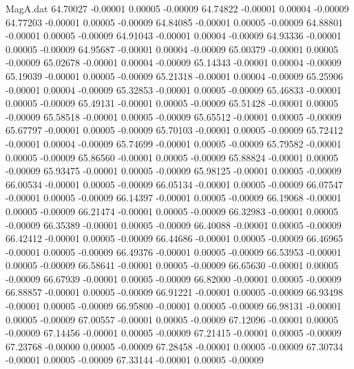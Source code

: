 \begin{filecontents}{MagA.dat}
  64.70027   -0.00001    0.00005   -0.00009
  64.74822   -0.00001    0.00004   -0.00009
  64.77203   -0.00001    0.00005   -0.00009
  64.84085   -0.00001    0.00005   -0.00009
  64.88801   -0.00001    0.00005   -0.00009
  64.91043   -0.00001    0.00004   -0.00009
  64.93336   -0.00001    0.00005   -0.00009
  64.95687   -0.00001    0.00004   -0.00009
  65.00379   -0.00001    0.00005   -0.00009
  65.02678   -0.00001    0.00004   -0.00009
  65.14343   -0.00001    0.00004   -0.00009
  65.19039   -0.00001    0.00005   -0.00009
  65.21318   -0.00001    0.00004   -0.00009
  65.25906   -0.00001    0.00004   -0.00009
  65.32853   -0.00001    0.00005   -0.00009
  65.46833   -0.00001    0.00005   -0.00009
  65.49131   -0.00001    0.00005   -0.00009
  65.51428   -0.00001    0.00005   -0.00009
  65.58518   -0.00001    0.00005   -0.00009
  65.65512   -0.00001    0.00005   -0.00009
  65.67797   -0.00001    0.00005   -0.00009
  65.70103   -0.00001    0.00005   -0.00009
  65.72412   -0.00001    0.00004   -0.00009
  65.74699   -0.00001    0.00005   -0.00009
  65.79582   -0.00001    0.00005   -0.00009
  65.86560   -0.00001    0.00005   -0.00009
  65.88824   -0.00001    0.00005   -0.00009
  65.93475   -0.00001    0.00005   -0.00009
  65.98125   -0.00001    0.00005   -0.00009
  66.00534   -0.00001    0.00005   -0.00009
  66.05134   -0.00001    0.00005   -0.00009
  66.07547   -0.00001    0.00005   -0.00009
  66.14397   -0.00001    0.00005   -0.00009
  66.19068   -0.00001    0.00005   -0.00009
  66.21474   -0.00001    0.00005   -0.00009
  66.32983   -0.00001    0.00005   -0.00009
  66.35389   -0.00001    0.00005   -0.00009
  66.40088   -0.00001    0.00005   -0.00009
  66.42412   -0.00001    0.00005   -0.00009
  66.44686   -0.00001    0.00005   -0.00009
  66.46965   -0.00001    0.00005   -0.00009
  66.49376   -0.00001    0.00005   -0.00009
  66.53953   -0.00001    0.00005   -0.00009
  66.58641   -0.00001    0.00005   -0.00009
  66.65630   -0.00001    0.00005   -0.00009
  66.67939   -0.00001    0.00005   -0.00009
  66.82000   -0.00001    0.00005   -0.00009
  66.88857   -0.00001    0.00005   -0.00009
  66.91221   -0.00001    0.00005   -0.00009
  66.93498   -0.00001    0.00005   -0.00009
  66.95800   -0.00001    0.00005   -0.00009
  66.98131   -0.00001    0.00005   -0.00009
  67.00557   -0.00001    0.00005   -0.00009
  67.12096   -0.00001    0.00005   -0.00009
  67.14456   -0.00001    0.00005   -0.00009
  67.21415   -0.00001    0.00005   -0.00009
  67.23768   -0.00000    0.00005   -0.00009
  67.28458   -0.00001    0.00005   -0.00009
  67.30734   -0.00001    0.00005   -0.00009
  67.33144   -0.00001    0.00005   -0.00009

\end{filecontents}
